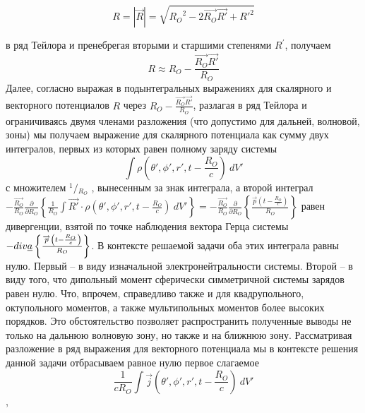 \documentclass[11pt]{article}
\begin{document}
\begin{equation}
R = |\overrightarrow{R}|=\sqrt{{{R}_{O}}^{2}-2\overrightarrow{{{R}_{O}}}\overrightarrow{R'}+R{{'}^{2}}}
\end{equation}

в ряд Тейлора и пренебрегая вторыми и старшими степенями
\({{R}^{'}}\), получаем
\begin{equation}R\approx {{R}_{O}}-\frac{\overrightarrow{{{R}_{O}}}\overrightarrow{R'}}{{{R}_{O}}}\end{equation}
Далее, согласно \cite{Tamm1957} выражая в подынтегральных
выражениях для скалярного и векторного потенциалов \(R\) через
\({{R}_{O}}-\frac{\overrightarrow{{{R}_{O}}}\overrightarrow{R'}}{{{R}_{O}}}\),
разлагая в ряд Тейлора и ограничиваясь двумя членами разложения (что
допустимо для дальней, волновой, зоны) мы получаем выражение для
скалярного потенциала как сумму двух интегралов, первых из которых равен
полному заряду системы
\begin{equation}\int{\rho \left( \theta ',\phi ',r',t-\frac{{{R}_{O}}}{c} \right)}~dV'\end{equation}
с множителем \({}^{1}/{}_{{{R}_{O}}}\) , вынесенным за знак интеграла, а
второй интеграл \(
-\frac{\overrightarrow{{R}_{O}}}{{R}_{O}}\frac{\partial }{\partial {{R}_{O}}}
\left\{
\frac{1}{{{R}_{O}}}\int{\overrightarrow{R'}\cdot \rho \left( \theta ',\phi ',r',t-\frac{{{R}_{O}}}{c} \right)}~dV'
\right\}
=-\frac{\overrightarrow{{{R}_{O}}}}{{{R}_{O}}}\frac{\partial }{\partial {{R}_{O}}}\left\{
\frac{\overrightarrow{p}\left( t-\frac{{{R}_{O}}}{c} \right)}{{{R}_{O}}}
\right\}\)
равен дивергенции, взятой по точке наблюдения вектора Герца
системы \(
-di{v}\emph{{a}}
\left\{
\frac{\overrightarrow{p}\left( t-\frac{{R}_{O}}{c} \right)}{{R}_{O}}
\right\}
\). В контексте решаемой задачи оба этих интеграла равны нулю.
Первый -- в виду изначальной электронейтральности системы. Второй -- в
виду того, что дипольный момент сферически симметричной системы зарядов
равен нулю. Что, впрочем, справедливо также и для квадрупольного,
октупольного моментов, а также мультипольных моментов более высоких
порядков. Это обстоятельство позволяет распространить полученные выводы
не только на дальнюю волновую зону, но также и на ближнюю зону.
Рассматривая разложение в ряд выражения для векторного потенциала мы в
контексте решения данной задачи отбрасываем равное нулю первое
слагаемое\begin{equation}\frac{1}{c{{R}_{O}}}\int{\overrightarrow{j}\left( \theta ',\phi ',r',t-\frac{{{R}_{O}}}{c} \right)}~dV'\end{equation},
\end{document}
